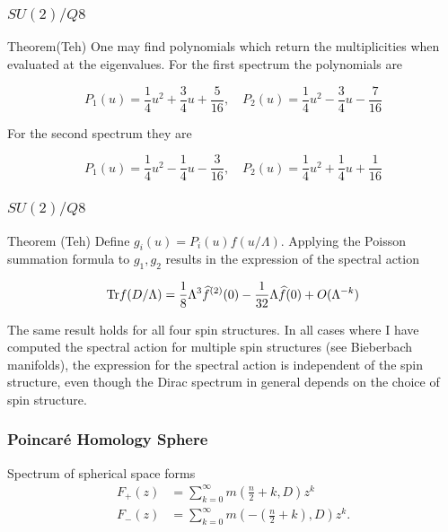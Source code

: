 \documentclass{beamer}
\def\Tr{{\rm Tr}}
\begin{document}
\begin{frame}
	\frametitle{$SU(2)/Q8$}
	\begin{block}{Theorem(Teh)}
		One may find polynomials which return the multiplicities when evaluated at the eigenvalues. For the first spectrum the polynomials are
		
		\[
P_1(u) =\frac{1}{4} u^2 + \frac{3}{4} u + \frac{5}{16}, \quad P_2(u) =  \frac{1}{4} u^2 - \frac{3}{4} u - \frac{7}{16}
		\]
		
		For the second spectrum they are
		
		\[
P_1(u)  = \frac{1}{4} u^2 - \frac{1}{4} u - \frac{3}{16}, \quad P_2(u)  = \frac{1}{4} u^2 + \frac{1}{4} u + \frac{1}{16}
		\]
	\end{block}
\end{frame}

\begin{frame}
	\frametitle{$SU(2)/Q8$}
	\begin{block}{Theorem (Teh)}
		Define $g_i(u) = P_i(u)f(u/\Lambda)$. Applying the Poisson summation formula to $g_1, g_2$ results in the expression of the spectral action
		
		\[
		\Tr f(D/\Lambda) = \frac{1}{8}\Lambda^3 \widehat{f}^{(2)}(0) - \frac{1}{32}\Lambda \widehat{f}(0) + O(\Lambda^{-k})
		\]
	\end{block}
	
	\pause
	
	\begin{block}{}
		The same result holds for all four spin structures. In all cases where I have computed the spectral action for multiple spin structures (see Bieberbach manifolds), the expression for the spectral action is independent of the spin structure, even though the Dirac spectrum in general depends on the choice of spin structure.
	\end{block}
\end{frame}

\begin{frame}
	\frametitle{Poincar\'e Homology Sphere}
	\begin{block}{Spectrum of spherical space forms}
	\begin{align*}
F_+(z) & = \sum_{k=0}^{\infty} m (\frac{n}{2}+k,D)z^k  \\
F_-(z) &= \sum_{k=0}^{\infty} m (-(\frac{n}{2}+k),D)z^k .
\end{align*}
	\end{block}
\end{frame}
\end{document}
